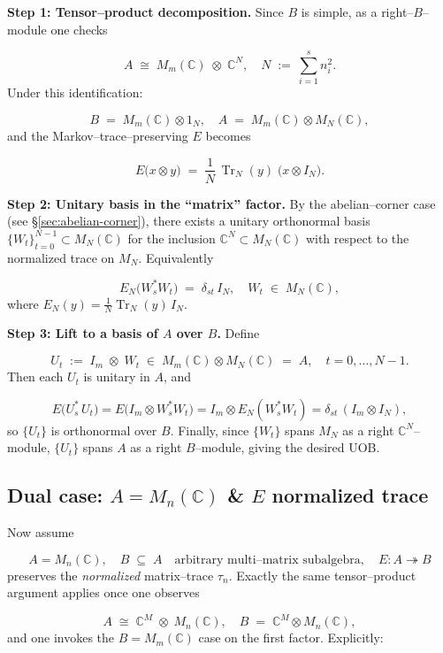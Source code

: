 \documentclass[11pt]{article}
\theoremstyle{mytheoremstyle}
\theoremstyle{definition}
\theoremstyle{remark}
\DeclareMathOperator{\Tr}{Tr}
\newcommand{\bbC}{\mathbb{C}}
\begin{document}
\medskip
\noindent\textbf{Step 1: Tensor–product decomposition.} Since \(B\) is simple, as a right–\(B\)–module one checks

\[
  A \;\cong\; M_m(\bbC)\;\otimes\;\bbC^N, \quad
  N \;:=\ \sum_{i=1}^s\!n_i^2.
\]
Under this identification:

\[
  B \;=\; M_m(\bbC)\otimes 1_N, \quad
  A \;=\; M_m(\bbC)\otimes M_N(\bbC),
\]
and the Markov–trace–preserving \(E\) becomes

\[
  E\bigl(x\otimes y\bigr)
  \;=\; 
  \frac1N\,\Tr_N(y)\;\bigl(x\otimes I_N\bigr).
\]

\medskip
\noindent\textbf{Step 2: Unitary basis in the “matrix” factor.} By the abelian–corner case (see \S\ref{sec:abelian-corner}), there exists
a unitary orthonormal basis
\(\{W_t\}_{t=0}^{N-1}\subset M_N(\bbC)\)
for the inclusion \(\bbC^N\subset M_N(\bbC)\)
with respect to the normalized trace on \(M_N\).  Equivalently

\[
  E_N\bigl(W_s^*W_t\bigr)
  \;=\;\delta_{st}\,I_N, \quad
  W_t\;\in\;M_N(\bbC),
\]
where \(E_N(y)=\tfrac1N\Tr_N(y)\,I_N\).

\medskip
\noindent\textbf{Step 3: Lift to a basis of \(A\) over \(B\).} Define

\[
  U_t \;:=\; I_m \;\otimes\; W_t
  \;\in\;M_m(\bbC)\otimes M_N(\bbC)\;=\;A, \quad
  t=0,\dots,N-1.
\]
Then each \(U_t\) is unitary in \(A\), and

\[
  E\bigl(U_s^*\,U_t\bigr)
  =E\bigl(I_m\otimes W_s^*W_t\bigr)
  =I_m\otimes E_N(W_s^*W_t)
  =\delta_{st}\,(I_m\otimes I_N),
\]
so \(\{U_t\}\) is orthonormal over \(B\).  Finally, since \(\{W_t\}\)
spans \(M_N\) as a right \(\bbC^N\)–module, \(\{U_t\}\)
spans \(A\) as a right \(B\)–module, giving the desired UOB.

\bigskip
\subsection{Dual case: $A=M_n(\bbC)$ \& $E$ normalized trace}
\label{sec:simple-corner-A}

Now assume

\[
  A=M_n(\bbC),
  \quad
  B\;\subseteq\;A
  \quad\text{arbitrary multi–matrix subalgebra}, \quad
  E\colon A\twoheadrightarrow B
\]
preserves the \emph{normalized} matrix–trace \(\tau_n\).  Exactly the same
tensor–product argument applies once one observes

\[
  A\;\cong\;\bbC^M\;\otimes\;M_n(\bbC), \quad
  B\;=\;\bbC^M\otimes M_n(\bbC),
\]
and one invokes the $B=M_m(\bbC)$ case on the first factor.  Explicitly:
\end{document}
